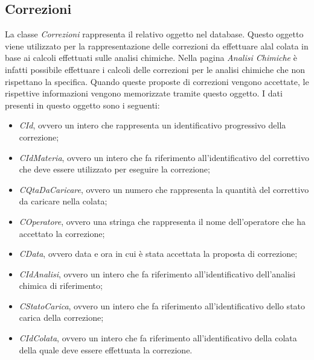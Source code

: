   \subsection{Correzioni}
  La classe \textit{Correzioni} rappresenta il relativo oggetto nel database. Questo oggetto viene utilizzato per la
  rappresentazione delle correzioni da effettuare alal colata in base ai calcoli effettuati sulle analisi chimiche.
  Nella pagina \textit{Analisi Chimiche} è infatti possibile effettuare i calcoli delle correzioni per le analisi chimiche
  che non rispettano la specifica. Quando queste proposte di correzioni vengono accettate, le rispettive informazioni vengono
  memorizzate tramite questo oggetto. I dati presenti in questo oggetto sono i seguenti:
  \begin{itemize}
      \item \textit{CId}, ovvero un intero che rappresenta un identificativo progressivo della correzione;
      \item \textit{CIdMateria}, ovvero un intero che fa riferimento all'identificativo del correttivo che deve essere
      utilizzato per eseguire la correzione;
      \item \textit{CQtaDaCaricare}, ovvero un numero che rappresenta la quantità del correttivo da caricare nella colata;
      \item \textit{COperatore}, ovvero una stringa che rappresenta il nome dell'operatore che ha accettato la correzione;
      \item \textit{CData}, ovvero data e ora in cui è stata accettata la proposta di correzione;
      \item \textit{CIdAnalisi}, ovvero un intero che fa riferimento all'identificativo dell'analisi chimica di riferimento;
      \item \textit{CStatoCarica}, ovvero un intero che fa riferimento all'identificativo dello stato carica della correzione;
      \item \textit{CIdColata}, ovvero un intero che fa riferimento all'identificativo della colata della quale deve essere
      effettuata la correzione.
  \end{itemize}

